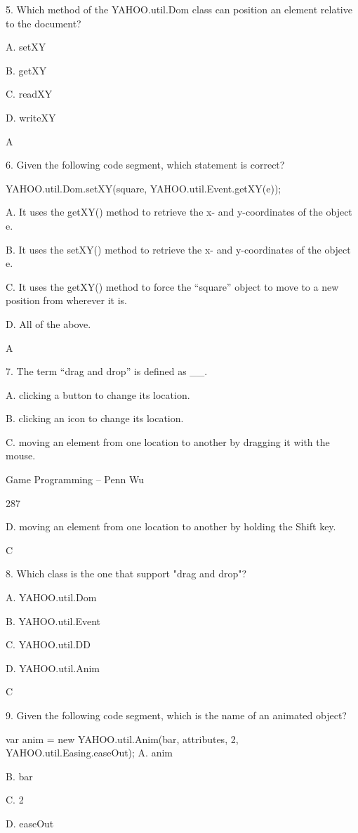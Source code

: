 \documentclass[
]{article}
\begin{document}
5. Which method of the YAHOO.util.Dom class can position an element
relative to the document?

A. setXY

B. getXY

C. readXY

D. writeXY

A

6. Given the following code segment, which statement is correct?

YAHOO.util.Dom.setXY(\textquotesingle square\textquotesingle,
YAHOO.util.Event.getXY(e));

A. It uses the getXY() method to retrieve the x- and y-coordinates of
the object e.

B. It uses the setXY() method to retrieve the x- and y-coordinates of
the object e.

C. It uses the getXY() method to force the ``square'' object to move to
a new position from wherever it is.

D. All of the above.

A

7. The term ``drag and drop'' is defined as \_\_.

A. clicking a button to change its location.

B. clicking an icon to change its location.

C. moving an element from one location to another by dragging it with
the mouse.

Game Programming -- Penn Wu

287

\protect\hypertarget{index_split_015.htmlux5cux23p288}{}{}D. moving an
element from one location to another by holding the Shift key.

C

8. Which class is the one that support "drag and drop"?

A. YAHOO.util.Dom

B. YAHOO.util.Event

C. YAHOO.util.DD

D. YAHOO.util.Anim

C

9. Given the following code segment, which is the name of an animated
object?

var anim = new YAHOO.util.Anim(\textquotesingle bar\textquotesingle,
attributes, 2, YAHOO.util.Easing.easeOut); A. anim

B. bar

C. 2

D. easeOut
\end{document}

